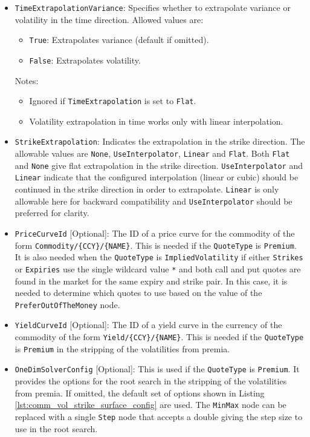 \begin{itemize}
\item \lstinline!TimeExtrapolationVariance!:
Specifies whether to extrapolate variance or volatility in the time direction. Allowed values are:
  \begin{itemize}
    \item \lstinline!True!: Extrapolates variance (default if omitted).
    \item \lstinline!False!: Extrapolates volatility.
  \end{itemize}
  Notes:
  \begin{itemize}
    \item Ignored if \lstinline!TimeExtrapolation! is set to \lstinline!Flat!.
    \item Volatility extrapolation in time works only with linear interpolation.
  \end{itemize}
\item \lstinline!StrikeExtrapolation!:
Indicates the extrapolation in the strike direction. The allowable values are \lstinline!None!, \lstinline!UseInterpolator!, \lstinline!Linear! and \lstinline!Flat!. Both \lstinline!Flat! and \lstinline!None! give flat extrapolation in the strike direction. \lstinline!UseInterpolator! and \lstinline!Linear! indicate that the configured interpolation (linear or cubic) should be continued in the strike direction in order to extrapolate. \lstinline!Linear! is only allowable here for backward compatibility and \lstinline!UseInterpolator! should be preferred for clarity.

\item \lstinline!PriceCurveId! [Optional]:
The ID of a price curve for the commodity of the form \lstinline!Commodity/{CCY}/{NAME}!. This is needed if the \lstinline!QuoteType! is \lstinline!Premium!. It is also needed when the \lstinline!QuoteType! is \lstinline!ImpliedVolatility! if either \lstinline!Strikes! or \lstinline!Expiries! use the single wildcard value \lstinline!*! and both call and put quotes are found in the market for the same expiry and strike pair. In this case, it is needed to determine which quotes to use based on the value of the \lstinline!PreferOutOfTheMoney! node.

\item \lstinline!YieldCurveId! [Optional]:
The ID of a yield curve in the currency of the commodity of the form \lstinline!Yield/{CCY}/{NAME}!. This is needed if the \lstinline!QuoteType! is \lstinline!Premium! in the stripping of the volatilities from premia.

\item \lstinline!OneDimSolverConfig! [Optional]:
This is used if the \lstinline!QuoteType! is \lstinline!Premium!. It provides the options for the root search in the stripping of the volatilities from premia. If omitted, the default set of options shown in Listing \ref{lst:comm_vol_strike_surface_config} are used. The \lstinline!MinMax! node can be replaced with a single \lstinline!Step! node that accepts a double giving the step size to use in the root search.


\end{itemize}
